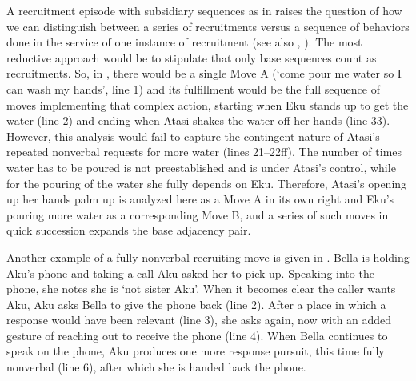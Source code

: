 \documentclass[output=paper]{langsci/langscibook}
\begin{document}
A recruitment episode with subsidiary sequences as in  raises the question of how we can distinguish between a series of recruitments versus a sequence of behaviors done in the service of one instance of recruitment (see also , ). The most reductive approach would be to stipulate that only base sequences count as recruitments. So, in , there would be a single Move A (‘come pour me water so I can wash my hands’, line 1) and its fulfillment would be the full sequence of moves implementing that complex action, starting when Eku stands up to get the water (line 2) and ending when Atasi shakes the water off her hands (line 33). However, this analysis would fail to capture the contingent nature of Atasi’s repeated nonverbal requests for more water (lines 21--22ff). The number of times water has to be poured is not preestablished and is under Atasi’s control, while for the pouring of the water she fully depends on Eku. Therefore, Atasi’s opening up her hands palm up is analyzed here as a Move A in its own right and Eku’s pouring more water as a corresponding Move B, and a series of such moves in quick succession expands the base adjacency pair.

Another example of a fully nonverbal recruiting move is given in . Bella is holding Aku’s phone and taking a call Aku asked her to pick up. Speaking into the phone, she notes she is ‘not sister Aku’. When it becomes clear the caller wants Aku, Aku asks Bella to give the phone back (line 2). After a place in which a response would have been relevant (line 3), she asks again, now with an added gesture of reaching out to receive the phone (line 4). When Bella continues to speak on the phone, Aku produces one more response pursuit, this time fully nonverbal (line 6), after which she is handed back the phone.
\end{document}
